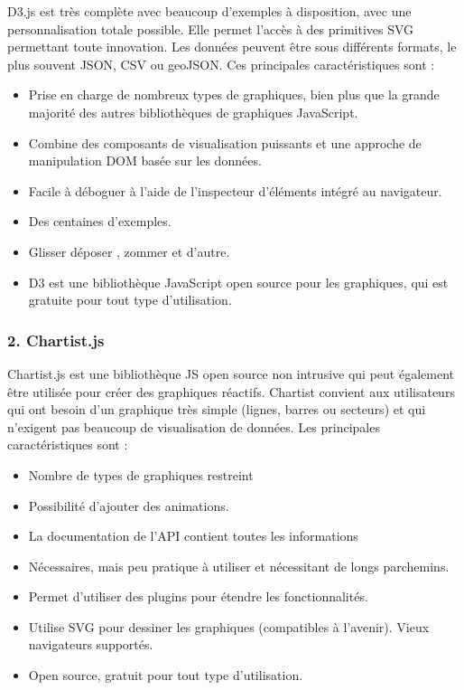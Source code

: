 \documentclass[french, a4paper, 12pt]{report}
\begin{document}
D3.js est très complète avec beaucoup d’exemples à disposition, avec une personnalisation totale possible. Elle permet l’accès à des primitives SVG permettant toute innovation. Les données peuvent être sous différents formats, le plus souvent JSON,  CSV ou geoJSON. Ces principales caractéristiques sont : 

\begin{itemize}
    \item Prise en charge de nombreux types de graphiques, bien plus que la grande majorité des autres bibliothèques de graphiques JavaScript.
    \item Combine des composants de visualisation puissants et une approche de manipulation DOM basée sur les données.
    \item Facile à déboguer à l'aide de l'inspecteur d'éléments intégré au navigateur.
    \item Des centaines d'exemples.
    \item Glisser déposer , zommer et d'autre.
    \item D3 est une bibliothèque JavaScript open source pour les graphiques, qui est gratuite pour tout type d'utilisation.
    
\end{itemize}
\subsubsection{2. Chartist.js}
Chartist.js est une bibliothèque JS open source non intrusive qui peut également être utilisée pour créer des graphiques réactifs. Chartist convient aux utilisateurs qui ont besoin d’un graphique très simple (lignes, barres ou secteurs) et qui n’exigent pas beaucoup de visualisation de données. Les principales caractéristiques sont :
\begin{itemize}
\item \textbf{} Nombre de types de graphiques restreint
\item \textbf{} Possibilité d’ajouter des animations.
\item \textbf{} La documentation de l’API contient toutes les informations
\item \textbf{}  Nécessaires, mais peu pratique à utiliser et nécessitant de longs parchemins.
\item \textbf{} Permet d'utiliser des plugins pour étendre les fonctionnalités.
\item \textbf{} Utilise SVG pour dessiner les graphiques (compatibles à l’avenir).
Vieux navigateurs supportés.
\item \textbf{} Open source, gratuit pour tout type d’utilisation.
\end{itemize} 
\end{document}
